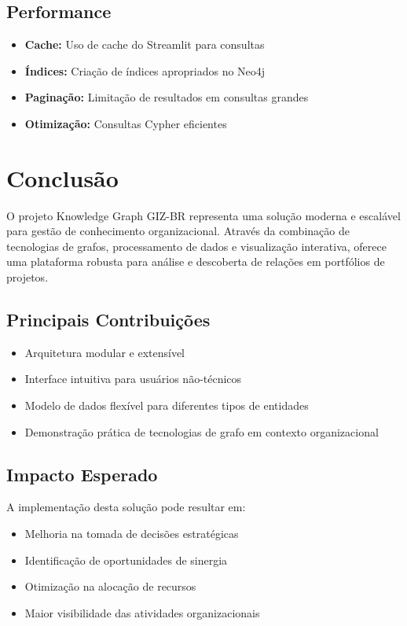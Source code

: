 \documentclass[12pt,a4paper]{article}
\begin{document}
\subsection{Performance}

\begin{itemize}
    \item \textbf{Cache:} Uso de cache do Streamlit para consultas
    \item \textbf{Índices:} Criação de índices apropriados no Neo4j
    \item \textbf{Paginação:} Limitação de resultados em consultas grandes
    \item \textbf{Otimização:} Consultas Cypher eficientes
\end{itemize}

\section{Conclusão}

O projeto Knowledge Graph GIZ-BR representa uma solução moderna e escalável para gestão de conhecimento organizacional. Através da combinação de tecnologias de grafos, processamento de dados e visualização interativa, oferece uma plataforma robusta para análise e descoberta de relações em portfólios de projetos.

\subsection{Principais Contribuições}

\begin{itemize}
    \item Arquitetura modular e extensível
    \item Interface intuitiva para usuários não-técnicos
    \item Modelo de dados flexível para diferentes tipos de entidades
    \item Demonstração prática de tecnologias de grafo em contexto organizacional
\end{itemize}

\subsection{Impacto Esperado}

A implementação desta solução pode resultar em:

\begin{itemize}
    \item Melhoria na tomada de decisões estratégicas
    \item Identificação de oportunidades de sinergia
    \item Otimização na alocação de recursos
    \item Maior visibilidade das atividades organizacionais
\end{itemize}
\end{document}
